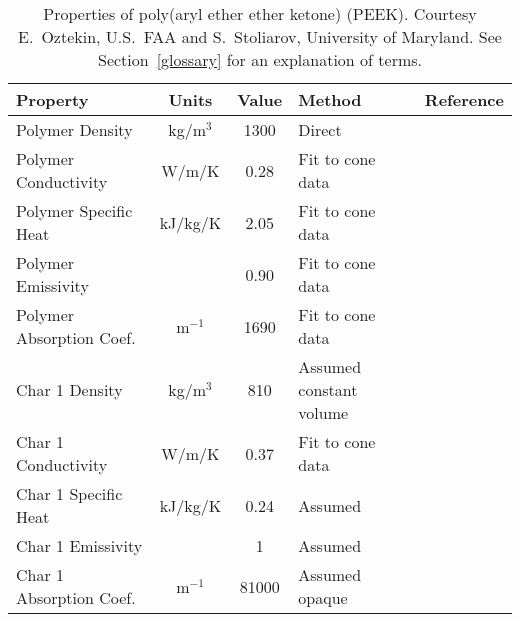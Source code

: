 \begin{table}[p]
\caption[Properties of poly(aryl ether ether ketone) (PEEK).]{Properties of poly(aryl ether ether ketone) (PEEK). Courtesy E.~Oztekin, U.S.~FAA and S.~Stoliarov,
University of Maryland. See Section~\ref{glossary} for an explanation of terms.}
\begin{center}
\begin{tabular}{|l|c|c|l|l|}
\hline
Property                    & Units         & Value                             & Method                    &  Reference                              \\ \hline \hline
Polymer Density             & kg/m$^3$      & 1300                              & Direct                    &  \cite{Oztekin:CF2012}                  \\ \hline
Polymer Conductivity        & W/m/K         & 0.28                              & Fit to cone data          &  \cite{Oztekin:CF2012}                  \\ \hline
Polymer Specific Heat       & kJ/kg/K       & 2.05                              & Fit to cone data          &  \cite{Oztekin:CF2012}                  \\ \hline
Polymer Emissivity          &               & 0.90                              & Fit to cone data          &  \cite{Oztekin:CF2012}                  \\ \hline
Polymer Absorption Coef.    & m$^{-1}$      & 1690                              & Fit to cone data          &  \cite{Oztekin:CF2012}                  \\ \hline
Char 1 Density              & kg/m$^3$      & 810                               & Assumed constant volume   &  \cite{Oztekin:CF2012}                  \\ \hline
Char 1 Conductivity         & W/m/K         & 0.37                              & Fit to cone data          &  \cite{Oztekin:CF2012}                  \\ \hline
Char 1 Specific Heat        & kJ/kg/K       & 0.24                              & Assumed                   &  \cite{Oztekin:CF2012}                  \\ \hline
Char 1 Emissivity           &               & 1                                 & Assumed                   &  \cite{Oztekin:CF2012}                  \\ \hline
Char 1 Absorption Coef.     & m$^{-1}$      & 81000                             & Assumed opaque            &  \cite{Oztekin:CF2012}                  \\ \hline

\end{tabular}
\end{center}
\end{table}
